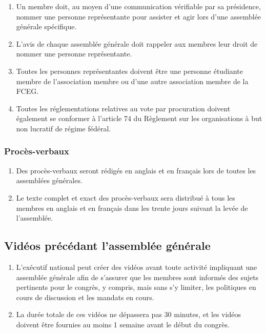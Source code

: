 \begin{enumerate}
 \item Un membre doit, au moyen d'une communication vérifiable par sa présidence, nommer une personne représentante pour assister et agir lors d'une assemblée générale spécifique.
 \item L'avis de chaque assemblée générale doit rappeler aux membres leur droit de nommer une personne représentante.
 \item Toutes les personnes représentantes doivent être une personne étudiante membre de l'association membre ou d’une autre association membre de la FCEG.
 \item Toutes les réglementations relatives au vote par procuration doivent également se conformer à l'article 74 du Règlement sur les organisations à but non lucratif de régime fédéral.
\end{enumerate}

\subsubsection{Procès-verbaux}
\label{lignes-directrices-des-reunions-proces-verbaux}

\begin{enumerate}
 \item Des procès-verbaux seront rédigés en anglais et en français lors de toutes les assemblées générales.
 \item Le texte complet et exact des procès-verbaux sera distribué à tous les membres en anglais et en français dans les trente jours suivant la levée de l'assemblée.
\end{enumerate}

\subsection{Vidéos précédant l'assemblée générale}
\label{assemblees-generales-videos-precedant-l-assemblee-generale}

\begin{enumerate}
 \item L'exécutif national peut créer des vidéos avant toute activité impliquant une assemblée générale afin de s'assurer que les membres sont informés des sujets pertinents pour le congrès, y compris, mais sans s'y limiter, les politiques en cours de discussion et les mandats en cours.
 \item La durée totale de ces vidéos ne dépassera pas 30 minutes, et les vidéos doivent être fournies au moins 1 semaine avant le début du congrès.
\end{enumerate}
